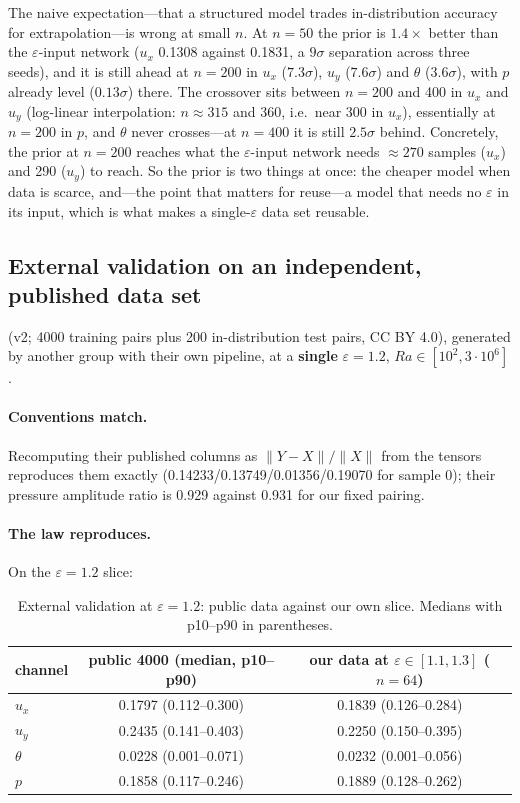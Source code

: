 \documentclass[11pt,a4paper]{article}
\begin{document}
The naive expectation---that a structured model trades in-distribution accuracy for
extrapolation---is wrong at small $n$. At $n=50$ the prior is $1.4\times$ better than the
$\varepsilon$-input network ($u_x$ 0.1308 against 0.1831, a $9\sigma$ separation across three seeds),
and it is still ahead at $n=200$ in $u_x$ ($7.3\sigma$), $u_y$ ($7.6\sigma$) and $\theta$
($3.6\sigma$), with $p$ already level ($0.13\sigma$) there. The crossover sits between $n=200$ and
400 in $u_x$ and $u_y$ (log-linear interpolation: $n\approx315$ and 360, i.e.\ near 300 in $u_x$),
essentially at $n=200$ in $p$, and $\theta$ never crosses---at $n=400$ it is still $2.5\sigma$
behind. Concretely, the prior at $n=200$ reaches what the $\varepsilon$-input network needs
$\approx270$ samples ($u_x$) and 290 ($u_y$) to reach. So the prior is two things at once: the
cheaper model when data is scarce, and---the point that matters for reuse---a model that needs no
$\varepsilon$ in its input, which is what makes a single-$\varepsilon$ data set reusable.

\subsection{External validation on an independent, published data set}
\label{sec:public}

 (v2; 4000 training pairs plus 200
in-distribution test pairs, CC BY 4.0), generated by another group with their own pipeline, at a
\textbf{single} $\varepsilon=1.2$, $Ra\in[10^2,3\cdot10^6]$ \citep{menglik2026neural}.

\paragraph{Conventions match.} Recomputing their published  columns as
$\|Y-X\|/\|X\|$ from the tensors reproduces them exactly (0.14233/0.13749/0.01356/0.19070 for
sample 0); their pressure amplitude ratio is 0.929 against 0.931 for our fixed pairing.

\paragraph{The law reproduces.} On the $\varepsilon=1.2$ slice:

\begin{table}[htbp]
\centering
\small
\caption{External validation at $\varepsilon=1.2$: public data against our own slice. Medians with
p10--p90 in parentheses.}
\label{tab:public}
\begin{tabular}{@{}lcc@{}}
\toprule
channel & public 4000 (median, p10--p90) & our data at $\varepsilon\in[1.1,1.3]$ ($n=64$)\\
\midrule
$u_x$ & 0.1797 (0.112--0.300) & 0.1839 (0.126--0.284)\\
$u_y$ & 0.2435 (0.141--0.403) & 0.2250 (0.150--0.395)\\
$\theta$ & 0.0228 (0.001--0.071) & 0.0232 (0.001--0.056)\\
$p$ & 0.1858 (0.117--0.246) & 0.1889 (0.128--0.262)\\
\bottomrule
\end{tabular}
\end{table}
\end{document}
